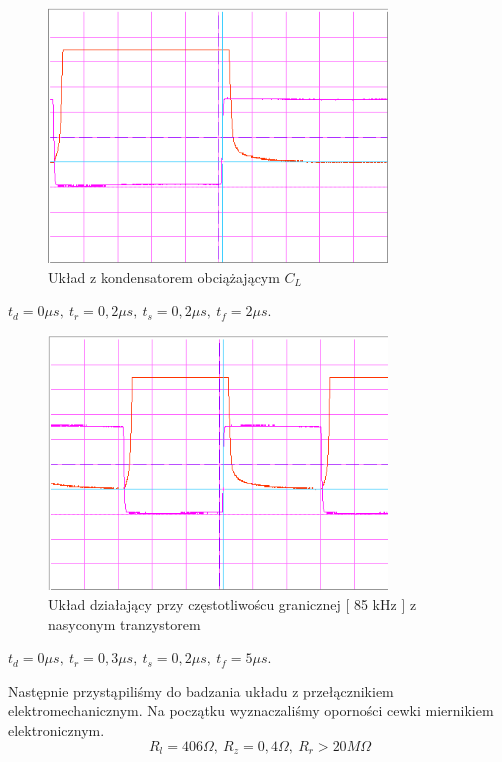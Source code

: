 \documentclass[a4paper,11pt]{article}
\begin{document}
\begin{figure} [H]
  \begin{center}
    \includegraphics[width = 9cm]{../Obrazki_i_tekst/obrobione/II1zkon2ciety.png}
    \caption{ Układ z kondensatorem obciążającym $C_L$ }
  \end{center}
\end{figure}
\(t_d = 0 \mu s,\ t_r = 0,2 \mu s,\ t_{s} = 0,2 \mu s,\ t_{f} = 2 \mu s \).

\begin{figure} [H]
  \begin{center}
    \includegraphics[width = 9cm]{../Obrazki_i_tekst/obrobione/II1zfgranicznaciety.png}
    \caption{ Układ działający przy częstotliwoścu granicznej [ 85 kHz ] z nasyconym tranzystorem }
  \end{center}
\end{figure}
\(t_d = 0 \mu s,\ t_r = 0,3 \mu s,\ t_{s} = 0,2 \mu s,\ t_{f} = 5 \mu s \).


Następnie przystąpiliśmy do badzania układu z przełącznikiem elektromechanicznym. 
Na początku wyznaczaliśmy oporności cewki miernikiem elektronicznym. 
$$ R_l = 406 \Omega, \ R_z = 0,4 \Omega, \ R_r > 20 M\Omega $$ 
\end{document}
